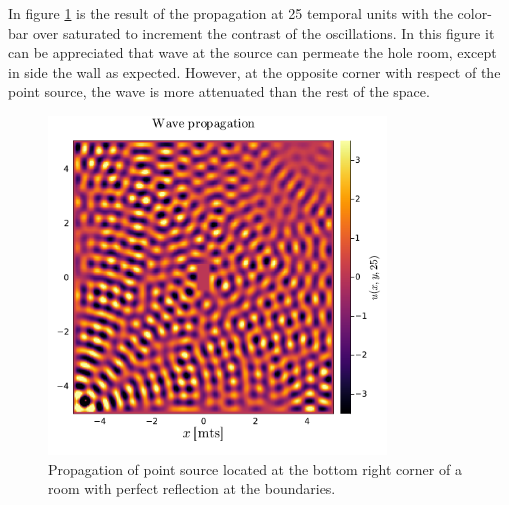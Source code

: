 \documentclass[main.tex]{subfiles}
\begin{document}
In figure \ref{fig8:waveResults} is the result of the propagation at 25 temporal units with the color-bar over saturated to increment the contrast of the oscillations.
In this figure it can be appreciated that wave at the source can permeate the hole room, except in side the wall as expected.
However, at the opposite corner with respect of the point source, the wave is more attenuated than the rest of the space.

\begin{figure}[ht!]
    \centering
    \includegraphics[width=0.8\textwidth]{imgs/hw8/waveEquationSols.pdf}
    \caption{Propagation of point source located at the bottom right corner of a room with perfect reflection at the boundaries.}
    \label{fig8:waveResults}
\end{figure}


\end{document}
